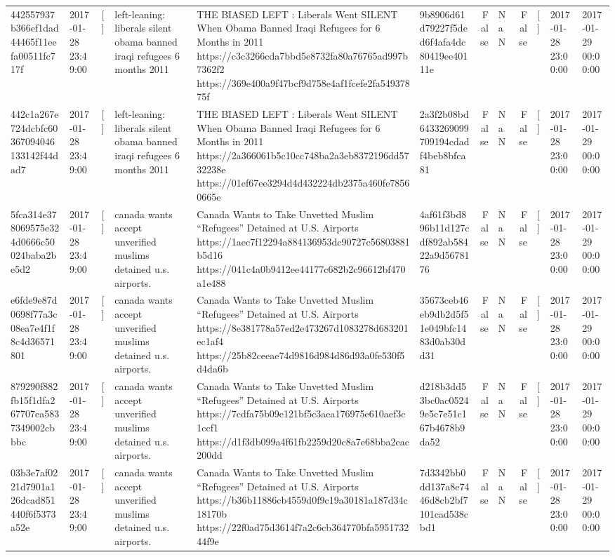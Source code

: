 \begin{tabular}{llllllrlrlll}
442557937b366ef1dad44465f11eefa00511fc717f & 2017-01-28 23:49:00 & [] & left-leaning: liberals silent obama banned iraqi refugees 6 months 2011 & THE BIASED LEFT : Liberals Went SILENT When Obama Banned Iraqi Refugees for 6 Months in 2011 https://c3c3266cda7bbd5e8732fa80a76765ad997b7362f2 https://369e400a9f47bcf9d758e4af1fcefe2fa54937875f & 9b8906d61d79227f5ded6f4afa4dc80419ee40111e & False & NaN & False & [] & 2017-01-28 23:00:00 & 2017-01-29 00:00:00 \\
442c1a267e724dcbfc60367094046133142f44dad7 & 2017-01-28 23:49:00 & [] & left-leaning: liberals silent obama banned iraqi refugees 6 months 2011 & THE BIASED LEFT : Liberals Went SILENT When Obama Banned Iraqi Refugees for 6 Months in 2011 https://2a366061b5c10cc748ba2a3eb8372196dd5732238e https://01ef67ee3294d4d432224db2375a460fe78560665e & 2a3f2b08bd6433269099709194cdadf4beb8bfca81 & False & NaN & False & [] & 2017-01-28 23:00:00 & 2017-01-29 00:00:00 \\
5fca314e378069575e324d0666c50024baba2be5d2 & 2017-01-28 23:49:00 & [] & canada wants accept unverified muslims detained u.s. airports. & Canada Wants to Take Unvetted Muslim “Refugees” Detained at U.S. Airports https://1aec7f12294a884136953dc90727c56803881b5d16 https://041c4a0b9412ee44177c682b2c96612bf470a1e488 & 4af61f3bd896b11d127cdf892ab58422a9d5678176 & False & NaN & False & [] & 2017-01-28 23:00:00 & 2017-01-29 00:00:00 \\
e6fde9e87d0698f77a3c08ea7e4f1f8c4d36571801 & 2017-01-28 23:49:00 & [] & canada wants accept unverified muslims detained u.s. airports. & Canada Wants to Take Unvetted Muslim “Refugees” Detained at U.S. Airports https://8e381778a57ed2e473267d1083278d683201ec1af4 https://25b82ceeae74d9816d984d86d93a0fe530f5d4da6b & 35673ceb46eb9db2d5f51e049bfc1483d0ab30dd31 & False & NaN & False & [] & 2017-01-28 23:00:00 & 2017-01-29 00:00:00 \\
879290f882fb15f1dfa267707ea5837349002cbbbc & 2017-01-28 23:49:00 & [] & canada wants accept unverified muslims detained u.s. airports. & Canada Wants to Take Unvetted Muslim “Refugees” Detained at U.S. Airports https://7cdfa75b09e121bf5c3aea176975e610aef3c1ccf1 https://d1f3db099a4f61fb2259d20c8a7e68bba2eac200dd & d218b3dd53bc0ac05249e5c7e51c167b4678b9da52 & False & NaN & False & [] & 2017-01-28 23:00:00 & 2017-01-29 00:00:00 \\
03b3e7af0221d7901a126dcad851440f6f5373a52e & 2017-01-28 23:49:00 & [] & canada wants accept unverified muslims detained u.s. airports. & Canada Wants to Take Unvetted Muslim “Refugees” Detained at U.S. Airports https://b36b11886cb4559d0f9c19a30181a187d34c18170b https://22f0ad75d3614f7a2c6cb364770bfa595173244f9e & 7d3342bb0dd137a8e7446d8cb2bf7101cad538cbd1 & False & NaN & False & [] & 2017-01-28 23:00:00 & 2017-01-29 00:00:00 \\

\end{tabular}
